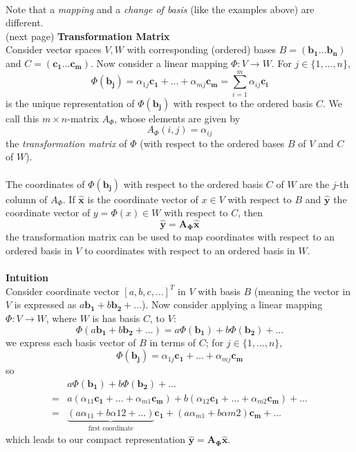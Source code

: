 \documentclass{report}
\begin{document}
\vspace{1mm}\\
Note that a \textit{mapping} and a \textit{change of basis} (like the examples above) are different.\\
(next page)
\newpage
\noindent\textbf{Transformation Matrix}\\
Consider vector spaces $V,W$ with corresponding (ordered) bases $B=(\bm{b_1\ldots b_n})$
and $C=(\bm{c_1\ldots c_m})$. Now consider a linear mapping 
$\Phi:V\rightarrow W$. For $j\in\{1,\ldots,n\}$,
\begin{equation*}
\Phi(\bm{b_j})=\alpha_{1j}\bm{c_1}+\ldots+
\alpha_{mj}\bm{c_m}=\sum^{m}_{i=1}\alpha_{ij}\bm{c_i}
\end{equation*}
is the unique representation of $\Phi(\bm{b_j})$ with respect to the ordered basis $C$. 
We call this $m\times n$-matrix $A_\Phi$, whose elements are given by
\begin{equation*}
A_\Phi(i,j)=\alpha_{ij}
\end{equation*}
the \textit{transformation matrix} of $\Phi$ (with respect to the ordered bases $B$ of $V$ and $C$ of $W$).\\
\vspace{1mm}\\
The coordinates of $\Phi(\bm{b_j})$ with respect to the ordered basis $C$ of $W$ are the $j$-th column of
$A_\Phi$. If $\hat{\bm{x}}$ is the coordinate vector of $x\in V$ with respect to $B$ and 
$\hat{\bm{y}}$ the coordinate vector of $y=\Phi(x)\in W$ with respect to $C$, then
\begin{equation*}
\hat{\bm{y}}=\bm{A_\Phi\hat{x}}
\end{equation*}
the transformation matrix can be used to map coordinates with respect to an ordered basis in $V$
to coordinates with respect to an ordered basis in $W$.\\
\vspace{1mm}\\
\textbf{Intuition}\\
Consider coordinate vector $[a,b,c,\ldots]^T$ in $V$ with basis $B$ (meaning the vector in $V$ is 
expressed as $a\bm{b_1}+b\bm{b_2}+\ldots$). Now consider applying a linear mapping $\Phi:V\rightarrow W$,
where $W$ is has basis $C$, to $V$:
\begin{equation*}
\Phi(a\bm{b_1}+b\bm{b_2}+\ldots)=a\Phi(\bm{b_1})+b\Phi(\bm{b_2})+\ldots
\end{equation*}
we express each basis vector of $B$ in terms of $C$; for $j\in\{1,\ldots,n\}$,
\begin{equation*}
\Phi(\bm{b_j})=\alpha_{1j}\bm{c_1}+\ldots+
\alpha_{mj}\bm{c_m}
\end{equation*}
so
\begin{align*}
&a\Phi(\bm{b_1})+b\Phi(\bm{b_2})+\ldots\\
=&a(\alpha_{11}\bm{c_1}+\ldots+\alpha_{m1}\bm{c_m})
+b(\alpha_{12}\bm{c_1}+\ldots+\alpha_{m2}\bm{c_m})+\ldots\\
=&\underbrace{(a\alpha_{11}+b\alpha{12}+\ldots)}_{\text{first coordinate}}\bm{c_1}+
(a\alpha_{m1}+b\alpha{m2})\bm{c_m}+\ldots
\end{align*}
which leads to our compact representation $\hat{\bm{y}}=\bm{A_\Phi\hat{x}}$. 
\newpage
\end{document}
